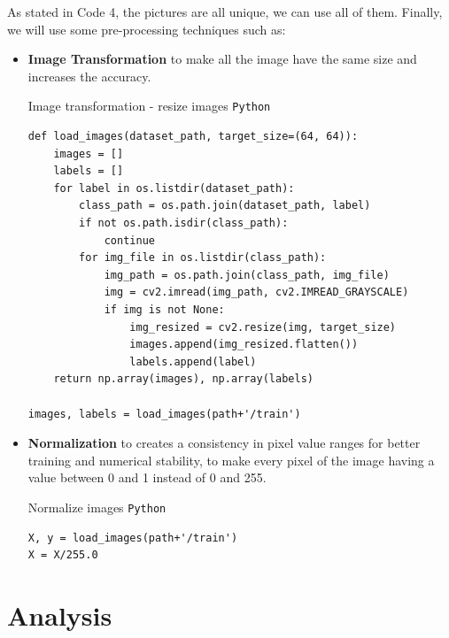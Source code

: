 \documentclass{modeleRapport}
\begin{document}
As stated in Code 4, the pictures are all unique, we can use all of them.
\newpage
Finally, we will use some pre-processing techniques such as:\\
\begin{itemize}

\item \textbf{Image Transformation} to make all the image have the same size and increases the accuracy.\\

\begin{codebox}{Image transformation - resize images \texttt{Python}}
\begin{verbatim}
def load_images(dataset_path, target_size=(64, 64)):
    images = []
    labels = []
    for label in os.listdir(dataset_path):
        class_path = os.path.join(dataset_path, label)
        if not os.path.isdir(class_path):
            continue
        for img_file in os.listdir(class_path):
            img_path = os.path.join(class_path, img_file)
            img = cv2.imread(img_path, cv2.IMREAD_GRAYSCALE) 
            if img is not None:
                img_resized = cv2.resize(img, target_size) 
                images.append(img_resized.flatten())
                labels.append(label)
    return np.array(images), np.array(labels)

images, labels = load_images(path+'/train')
\end{verbatim}
\end{codebox}

\bigskip

\item \textbf{Normalization} to creates a consistency in pixel value ranges for better training and numerical stability, to make every pixel of the image having a value between 0 and 1 instead of 0 and 255.\\

\begin{codebox}{Normalize images \texttt{Python}}
\begin{verbatim}
X, y = load_images(path+'/train')
X = X/255.0
\end{verbatim}
\end{codebox}

\end{itemize}

\newpage

\section{Analysis}
\end{document}
